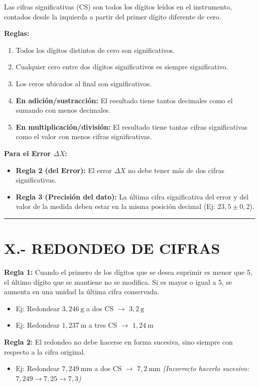 \documentclass[12pt,a4paper]{article}
\begin{document}
Las cifras significativas (CS) son todos los dígitos leídos en el instrumento, contados desde la izquierda a partir del primer dígito diferente de cero.

\textbf{Reglas:}
\begin{enumerate}
    \item Todos los dígitos distintos de cero son significativos.
    \item Cualquier cero entre dos dígitos significativos es siempre significativo.
    \item Los ceros ubicados al final son significativos.
    \item \textbf{En adición/sustracción:} El resultado tiene tantos decimales como el sumando con menos decimales.
    \item \textbf{En multiplicación/división:} El resultado tiene tantas cifras significativas como el valor con menos cifras significativas.
\end{enumerate}

\textbf{Para el Error $\Delta X$:}
\begin{itemize}
    \item \textbf{Regla 2 (del Error):} El error $\Delta X$ no debe tener más de dos cifras significativas.
    \item \textbf{Regla 3 (Precisión del dato):} La última cifra significativa del error y del valor de la medida deben estar en la misma posición decimal (Ej: $23,5 \pm 0,2$).
\end{itemize}

\vspace{0.5cm}
\hrule
\vspace{0.5cm}

\section{X.- REDONDEO DE CIFRAS}

\textbf{Regla 1:} Cuando el primero de los dígitos que se desea suprimir es menor que 5, el último dígito que se mantiene no se modifica. Si es mayor o igual a 5, se aumenta en una unidad la última cifra conservada.
\begin{itemize}
    \item Ej: Redondear $3,246\ \text{g}$ a dos CS $\rightarrow$ $3,2\ \text{g}$
    \item Ej: Redondear $1,237\ \text{m}$ a tres CS $\rightarrow$ $1,24\ \text{m}$
\end{itemize}

\textbf{Regla 2:} El redondeo no debe hacerse en forma sucesiva, sino siempre con respecto a la cifra original.
\begin{itemize}
    \item Ej: Redondear $7,249\ \text{mm}$ a dos CS $\rightarrow$ $7,2\ \text{mm}$ \textit{(Incorrecto hacerlo sucesivo: $7,249 \rightarrow 7,25 \rightarrow 7,3$)}
\end{itemize}
\end{document}
